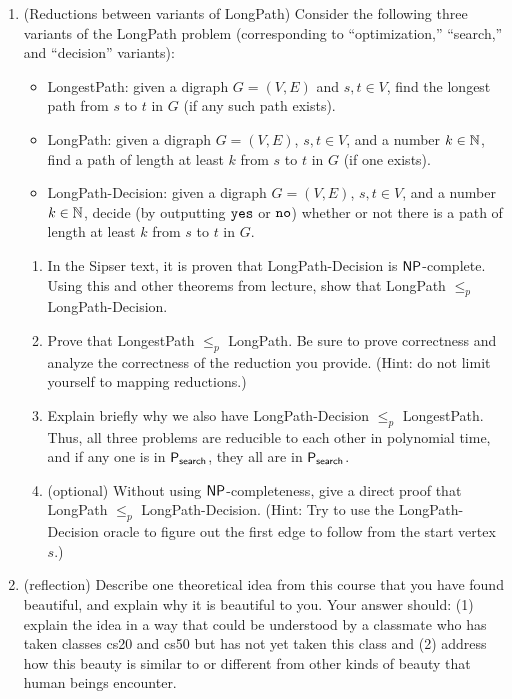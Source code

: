 \documentclass[11pt]{article}
\begin{document}
\begin{enumerate}
 \item (Reductions between variants of LongPath) 
 Consider the following three variants of the LongPath problem (corresponding to ``optimization,'' ``search,'' and ``decision'' variants):
 \begin{itemize}
     \item LongestPath: given a digraph $G=(V,E)$ and $s,t\in V$, find the longest path from $s$ to $t$ in $G$ (if any such path exists). 
     \item LongPath: given a digraph $G=(V,E)$, $s,t\in V$, and a number $k\in \mathbb{N}$, find a path of length at least $k$ from $s$ to $t$ in $G$ (if one exists).
     \item LongPath-Decision: given a digraph $G=(V,E)$, $s,t\in V$, and a number $k\in \mathbb{N}$, decide (by outputting $\texttt{yes}$ or $\texttt{no}$) whether or not there is a path of length at least $k$ from $s$ to $t$ in $G$.
 \end{itemize}

\begin{enumerate}
\item In the Sipser text, it is proven that LongPath-Decision is $\mathsf{NP}$-complete.  Using this and other theorems from lecture, show that LongPath $\leq_p$ LongPath-Decision. 

\item Prove that LongestPath $\leq_p$ LongPath.  Be sure to prove correctness and analyze the correctness of the reduction you provide.  (Hint: do not limit yourself to mapping reductions.)

\item Explain briefly why we also have LongPath-Decision $\leq_p$ LongestPath. Thus, all three problems are reducible to each other in polynomial time, and if any one is in $\mathsf{P_{search}}$, they all are in $\mathsf{P_{search}}$.

\item (optional) Without using $\mathsf{NP}$-completeness, give a direct proof that LongPath $\leq_p$ LongPath-Decision.
(Hint: Try to use the LongPath-Decision oracle to figure out the first edge to follow from the start vertex $s$.)
\end{enumerate}

\item (reflection) Describe one theoretical idea from this course that you have found beautiful, and explain why it is beautiful to you.  Your answer should: (1) explain the idea in a way that could be understood by a classmate who has taken classes cs20 and cs50 but has not yet taken this class and (2) address how this beauty is similar to or different from other kinds of beauty that human beings encounter.


\end{enumerate}
\end{document}
